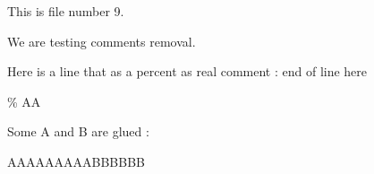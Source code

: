 This is file number 9.

We are testing comments removal. 

Here is a line that as a percent as real comment : end of line here%



\% \huge  AA

Some A and B are glued :

AAAAAAAAABBBBBB





